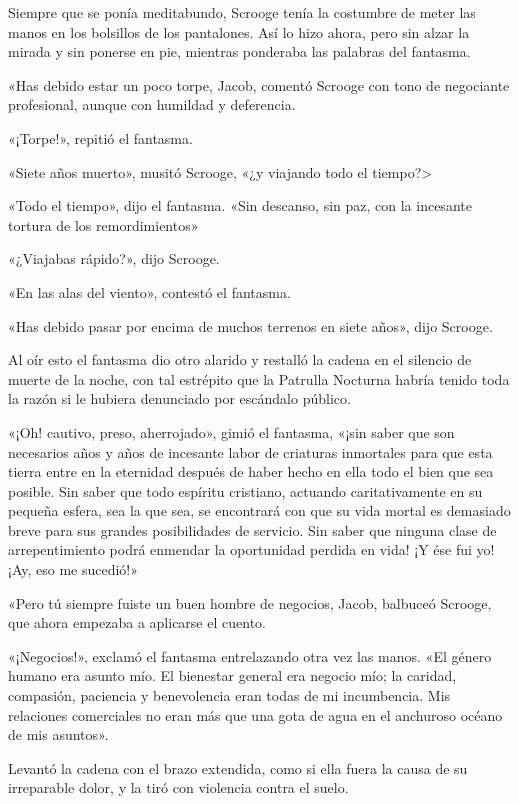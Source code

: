 \documentclass{novela}
\begin{document}
 Siempre que se ponía meditabundo, Scrooge tenía la costumbre de meter las manos en los bolsillos de los pantalones. Así lo hizo ahora, pero sin alzar la mirada y sin ponerse en pie, mientras ponderaba las palabras del fantasma.

 «Has debido estar un poco torpe, Jacob, comentó Scrooge con tono de negociante profesional, aunque con humildad y deferencia.

 «¡Torpe!», repitió el fantasma.

 «Siete años muerto», musitó Scrooge, «¿y viajando todo el tiempo?>

 «Todo el tiempo», dijo el fantasma. «Sin descanso, sin paz, con la incesante tortura de los remordimientos»

 «¿Viajabas rápido?», dijo Scrooge.

 «En las alas del viento», contestó el fantasma.

 «Has debido pasar por encima de muchos terrenos en siete años», dijo Scrooge.

 Al oír esto el fantasma dio otro alarido y restalló la cadena en el silencio de muerte de la noche, con tal estrépito que la Patrulla Nocturna habría tenido toda la razón si le hubiera denunciado por escándalo público.

 «¡Oh! cautivo, preso, aherrojado», gimió el fantasma, «¡sin saber que son necesarios años y años de incesante labor de criaturas inmortales para que esta tierra entre en la eternidad después de haber hecho en ella todo el bien que sea posible. Sin saber que todo espíritu cristiano, actuando caritativamente en su pequeña esfera, sea la que sea, se encontrará con que su vida mortal es demasiado breve para sus grandes posibilidades de servicio. Sin saber que ninguna clase de arrepentimiento podrá enmendar la oportunidad perdida en vida! ¡Y ése fui yo! ¡Ay, eso me sucedió!»

 «Pero tú siempre fuiste un buen hombre de negocios, Jacob, balbuceó Scrooge, que ahora empezaba a aplicarse el cuento.

 «¡Negocios!», exclamó el fantasma entrelazando otra vez las manos. «El género humano era asunto mío. El bienestar general era negocio mío; la caridad, compasión, paciencia y benevolencia eran todas de mi incumbencia. Mis relaciones comerciales no eran más que una gota de agua en el anchuroso océano de mis asuntos».

 Levantó la cadena con el brazo extendida, como si ella fuera la causa de su irreparable dolor, y la tiró con violencia contra el suelo.
\end{document}
